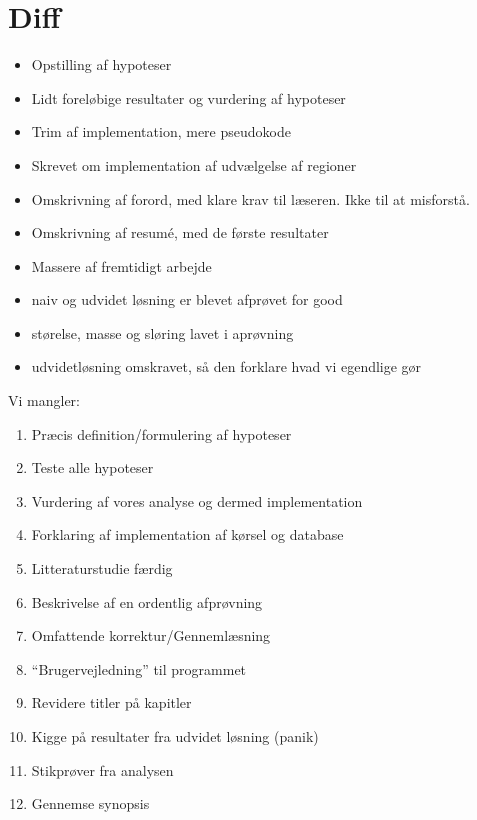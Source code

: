 {
\section*{Diff}
\begin{itemize}
    \item Opstilling af hypoteser
    \item Lidt foreløbige resultater og vurdering af hypoteser
    \item Trim af implementation, mere pseudokode
    \item Skrevet om implementation af udvælgelse af regioner
    \item Omskrivning af forord, med klare krav til læseren. Ikke
        til at misforstå.
    \item Omskrivning af resumé, med de første resultater
    \item Massere af fremtidigt arbejde
	\item naiv og udvidet løsning er blevet afprøvet for good
	\item størelse, masse og sløring lavet i aprøvning
	\item udvidetløsning omskravet, så den forklare hvad vi egendlige gør
\end{itemize}

Vi mangler:
\begin{enumerate}
    \item Præcis definition/formulering af hypoteser
    \item Teste alle hypoteser
    \item Vurdering af vores analyse og dermed implementation
    \item Forklaring af implementation af kørsel og database
    \item Litteraturstudie færdig
    \item Beskrivelse af en ordentlig afprøvning
    \item Omfattende korrektur/Gennemlæsning
    \item ``Brugervejledning'' til programmet
    \item Revidere titler på kapitler
    \item Kigge på resultater fra udvidet løsning (panik)
    \item Stikprøver fra analysen
    \item Gennemse synopsis
\end{enumerate}
}

